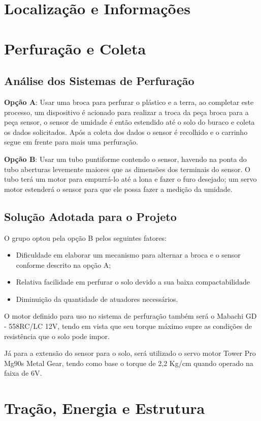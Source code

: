   
  
 
  \section{Localização e Informações}

  \section{Perfuração e Coleta}

  \subsection{Análise dos Sistemas de Perfuração}

  \textbf{Opção A}: Usar uma broca para perfurar o plástico e a terra, ao completar este
  processo, um dispositivo é acionado para realizar a troca da peça broca para
  a peça sensor, o sensor de umidade é então estendido até o solo do buraco e
  coleta os dados solicitados. Após a coleta dos dados o sensor é recolhido e o
  carrinho segue em frente para mais uma perfuração. 

  \textbf{Opção B}: Usar um tubo puntiforme contendo o sensor, havendo na ponta do tubo
  aberturas levemente maiores que as dimensões dos terminais do sensor. O tubo
  terá um motor para empurrá-lo até a lona e fazer o furo desejado; um servo
  motor estenderá o sensor para que ele possa fazer a medição da umidade.

  \subsection{Solução Adotada para o Projeto}
  
  O grupo optou pela opção B pelos seguintes fatores:

  \begin{itemize}
    \item Dificuldade em elaborar um mecanismo para alternar a broca e o sensor
    conforme descrito na opção A;
    \item Relativa facilidade em perfurar o solo devido a sua baixa compactabilidade
    \item Diminuição da quantidade de atuadores necessários.
  \end{itemize}

	O motor definido para uso no sistema de perfuração também será o
  Mabachi GD - 558RC/LC 12V, tendo em vista que seu torque máximo supre as
  condições de resistência que o solo pode impor.

  Já para a extensão do sensor para o solo, será utilizado o servo motor Tower
  Pro Mg90s Metal Gear, tendo como base o torque de 2,2 Kg/cm quando operado na faixa de 6V.

  \section{Tração, Energia e Estrutura}
